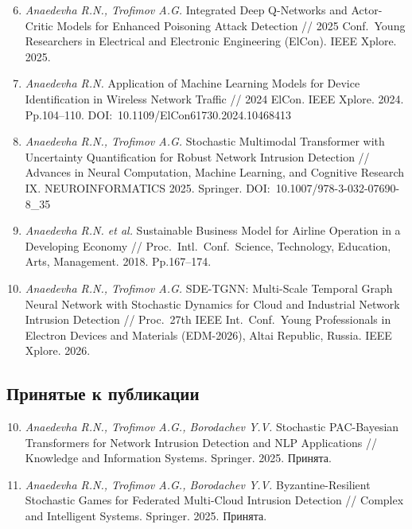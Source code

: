 \documentclass[12pt,a5paper]{article}
\begin{document}
\begin{enumerate}
\setcounter{enumi}{5}
\item \textit{Anaedevha R.N., Trofimov A.G.} Integrated Deep Q-Networks and Actor-Critic Models for Enhanced Poisoning Attack Detection // 2025 Conf.\ Young Researchers in Electrical and Electronic Engineering (ElCon). IEEE Xplore. 2025.

\item \textit{Anaedevha R.N.} Application of Machine Learning Models for Device Identification in Wireless Network Traffic // 2024 ElCon. IEEE Xplore. 2024. Pp.104--110. DOI:~10.1109/ElCon61730.2024.10468413

\item \textit{Anaedevha R.N., Trofimov A.G.} Stochastic Multimodal Transformer with Uncertainty Quantification for Robust Network Intrusion Detection // Advances in Neural Computation, Machine Learning, and Cognitive Research IX. NEUROINFORMATICS 2025. Springer. DOI:~10.1007/978-3-032-07690-8\_35

\item \textit{Anaedevha R.N. et al.} Sustainable Business Model for Airline Operation in a Developing Economy // Proc.\ Intl.\ Conf.\ Science, Technology, Education, Arts, Management. 2018. Pp.167--174.

\item \textit{Anaedevha R.N., Trofimov A.G.} SDE-TGNN: Multi-Scale Temporal Graph Neural Network with Stochastic Dynamics for Cloud and Industrial Network Intrusion Detection // Proc.\ 27th IEEE Int.\ Conf.\ Young Professionals in Electron Devices and Materials (EDM-2026), Altai Republic, Russia. IEEE Xplore. 2026.
\end{enumerate}

\subsection*{Принятые к публикации}

\begin{enumerate}
\setcounter{enumi}{9}
\item \textit{Anaedevha R.N., Trofimov A.G., Borodachev Y.V.} Stochastic PAC-Bayesian Transformers for Network Intrusion Detection and NLP Applications // Knowledge and Information Systems. Springer. 2025. Принята.

\item \textit{Anaedevha R.N., Trofimov A.G., Borodachev Y.V.} Byzantine-Resilient Stochastic Games for Federated Multi-Cloud Intrusion Detection // Complex and Intelligent Systems. Springer. 2025. Принята.
\end{enumerate}
\end{document}
